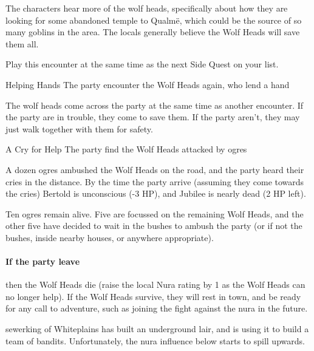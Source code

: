 \begin{multicols}{2}
The characters hear more of the wolf heads, specifically about how they are looking for some abandoned temple to Qualm\"e, which could be the source of so many goblins in the area.
The locals generally believe the Wolf Heads will save them all.

Play this encounter at the same time as the next Side Quest on your list.

{\squash Helping Hands}%
{The party encounter the Wolf Heads again, who lend a hand}%

The wolf heads come across the party at the same time as another encounter.
If the party are in trouble, they come to save them.
If the party aren't, they may just walk together with them for safety.

{A Cry for Help}%
{The party find the Wolf Heads attacked by ogres}%

A dozen ogres ambushed the Wolf Heads on the road, and the party heard their cries in the distance.
By the time the party arrive (assuming they come towards the cries) Bertold is unconscious (-3 HP), and Jubilee is nearly dead (2 HP left).

Ten ogres remain alive.
Five are focussed on the remaining Wolf Heads, and the other five have decided to wait in the bushes to ambush the party (or if not the bushes, inside nearby houses, or anywhere appropriate).

\paragraph{\N If the party leave}
then the Wolf Heads die (raise the local Nura rating by 1 as the Wolf Heads can no longer help).
If the Wolf Heads survive, they will rest in \gls{town}, and be ready for any call to adventure, such as joining the fight against the nura in the future.



\stopcontents[sq]

\label{sewerking}

\startcontents[sq]

\sqminitoc

\noindent
\Gls{sewerking} of Whiteplains has built an underground lair, and is using it to build a team of bandits.
Unfortunately, the nura influence below starts to spill upwards.


\end{multicols}
